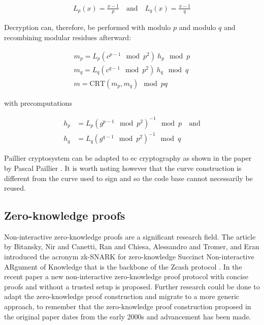 \begin{ceqn}
\begin{align*}
  L_p(x) = \frac{x-1}{p} \quad \text{and} \quad L_q(x) = \frac{x-1}{q}
\end{align*}
\end{ceqn}

Decryption can, therefore, be performed with modulo $p$ and modulo $q$ and
recombining modular residues afterward:

\begin{ceqn}
\begin{align*}
  m_p = L_p(c^{p-1} \mod p^2) \ h_p \mod p \\
  m_q = L_q(c^{q-1} \mod p^2) \ h_q \mod q \\
  m = \text{CRT}(m_p, m_q) \mod pq
\end{align*}
\end{ceqn}

with precomputations

\begin{ceqn}
\begin{align*}
  h_p &= L_p(g^{p-1} \mod p^2)^{-1} \mod p \quad \text{and} \\
  h_q &= L_q(g^{q-1} \mod p^2)^{-1} \mod q
\end{align*}
\end{ceqn}

Paillier cryptosystem can be adapted to \gls{ec} cryptography as shown in the
paper  by
Pascal Paillier \cite{10.1007/3-540-44448-3_44}. It is worth noting however that
the curve construction is different from the curve used to sign and so the code
base cannot necessarily be reused.

\subsection{Zero-knowledge proofs}

Non-interactive zero-knowledge proofs are a significant research field. The
article  by Bitansky, Nir and Canetti, Ran and
Chiesa, Alessandro and Tromer, and Eran \cite{Bitansky:2012:ECR:2090236.2090263}
introduced the acronym zk-SNARK for zero-knowledge Succinct Non-interactive
ARgument of Knowledge that is the backbone of the Zcash protocol
\cite{cryptoeprint:2014:349}. In the recent paper  \cite{cryptoeprint:2017:1066} a new
non-interactive zero-knowledge proof protocol with concise proofs and without a
trusted setup is proposed. Further research could be done to adapt the
zero-knowledge proof construction and migrate to a more generic approach, to
remember that the zero-knowledge proof construction proposed in the original
paper dates from the early 2000s and advancement has been made.


